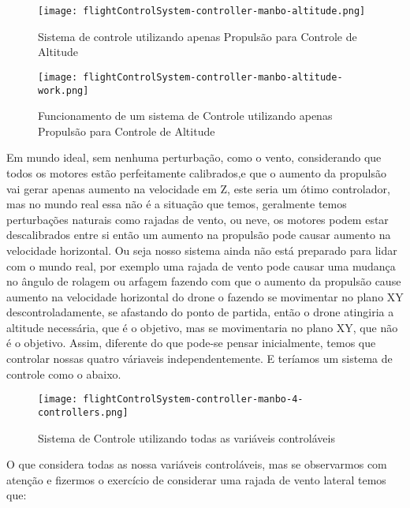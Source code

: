 \begin{figure}[H]
	\centering
	\texttt{[image: flightControlSystem-controller-manbo-altitude.png]}
	\caption{Sistema de controle utilizando apenas Propulsão para Controle de Altitude}
	\centering
	\label{Sistema de controle utilizando apenas Propulsão para Controle de Altitude}
\end{figure}


\begin{figure}[H]
	\centering
	\texttt{[image: flightControlSystem-controller-manbo-altitude-work.png]}
	\caption{Funcionamento de um sistema de Controle utilizando apenas Propulsão para Controle de Altitude}
	\centering
	\label{Funcionamento de um sistema de Controle utilizando apenas Propulsão para Controle de Altitude}
\end{figure}

Em mundo ideal, sem nenhuma perturbação, como o vento, considerando que todos os motores estão perfeitamente calibrados,e que o aumento da propulsão vai gerar apenas aumento na velocidade em Z, este seria um ótimo controlador, mas no mundo real essa não é a situação que temos, geralmente temos perturbações naturais como rajadas de vento, ou neve, os motores podem estar descalibrados entre si então um aumento na propulsão pode causar aumento na velocidade horizontal. Ou seja nosso sistema ainda não está preparado para lidar com o mundo real, por exemplo uma rajada de vento pode causar uma mudança no ângulo de rolagem ou arfagem fazendo com que o aumento da propulsão cause aumento na velocidade horizontal do drone o fazendo se movimentar no plano XY descontroladamente, se afastando do ponto de partida, então o drone atingiria a altitude necessária, que é o objetivo, mas se movimentaria no plano XY, que não é o objetivo. Assim, diferente do que pode-se pensar inicialmente, temos que controlar nossas quatro váriaveis independentemente. E teríamos um sistema de controle como o abaixo.


\begin{figure}[H]
	\centering
	\texttt{[image: flightControlSystem-controller-manbo-4-controllers.png]}
	\caption{Sistema de Controle utilizando todas as variáveis controláveis}
	\centering
	\label{Sistema de Controle utilizando todas as variáveis controláveis}
\end{figure}

O que considera todas as nossa variáveis controláveis, mas se observarmos com atenção e fizermos o exercício de considerar uma rajada de vento lateral temos que:


